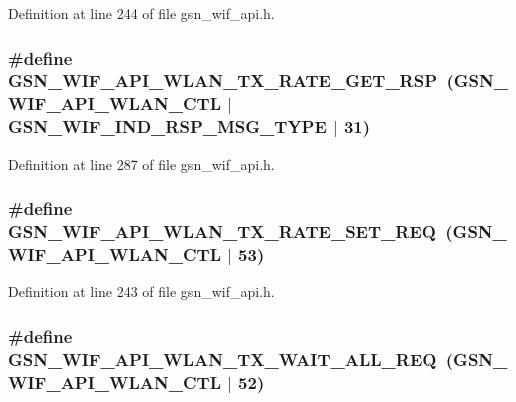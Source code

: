 Definition at line 244 of file gsn\_\-wif\_\-api.h.

\hypertarget{a00606_a0261724e99f5302926d5f1f03cf3cd90}{
\subsubsection[{GSN\_\-WIF\_\-API\_\-WLAN\_\-TX\_\-RATE\_\-GET\_\-RSP}]{\setlength{\rightskip}{0pt plus 5cm}\#define GSN\_\-WIF\_\-API\_\-WLAN\_\-TX\_\-RATE\_\-GET\_\-RSP~(GSN\_\-WIF\_\-API\_\-WLAN\_\-CTL $|$ GSN\_\-WIF\_\-IND\_\-RSP\_\-MSG\_\-TYPE $|$ 31)}}
\label{a00606_a0261724e99f5302926d5f1f03cf3cd90}


Definition at line 287 of file gsn\_\-wif\_\-api.h.

\hypertarget{a00606_a1bf24556a4e5c2d50882bde783ce8d11}{
\subsubsection[{GSN\_\-WIF\_\-API\_\-WLAN\_\-TX\_\-RATE\_\-SET\_\-REQ}]{\setlength{\rightskip}{0pt plus 5cm}\#define GSN\_\-WIF\_\-API\_\-WLAN\_\-TX\_\-RATE\_\-SET\_\-REQ~(GSN\_\-WIF\_\-API\_\-WLAN\_\-CTL $|$ 53)}}
\label{a00606_a1bf24556a4e5c2d50882bde783ce8d11}


Definition at line 243 of file gsn\_\-wif\_\-api.h.

\hypertarget{a00606_aa834a28f1568a4ca8b78849f2c231bee}{
\subsubsection[{GSN\_\-WIF\_\-API\_\-WLAN\_\-TX\_\-WAIT\_\-ALL\_\-REQ}]{\setlength{\rightskip}{0pt plus 5cm}\#define GSN\_\-WIF\_\-API\_\-WLAN\_\-TX\_\-WAIT\_\-ALL\_\-REQ~(GSN\_\-WIF\_\-API\_\-WLAN\_\-CTL $|$ 52)}}
\label{a00606_aa834a28f1568a4ca8b78849f2c231bee}



